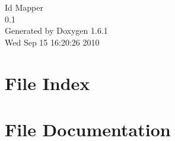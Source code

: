 \documentclass[a4paper]{book}
\begin{document}
\begin{titlepage}
\vspace*{7cm}
\begin{center}
{\Large Id Mapper \\[1ex]\large 0.1 }\\
\vspace*{1cm}
{\large Generated by Doxygen 1.6.1}\\
\vspace*{0.5cm}
{\small Wed Sep 15 16:20:26 2010}\\
\end{center}
\end{titlepage}
\clearemptydoublepage
{}
\tableofcontents
\clearemptydoublepage
{}
\chapter{File Index}

\chapter{File Documentation}



\printindex
\end{document}
